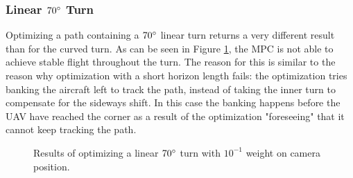 \subsubsection{Linear $70\degree$ Turn}

Optimizing a path containing a $70\degree$ linear turn returns a very different result than for the curved turn. As can be seen in Figure \ref{fig:turns_lin_70deg_pos1}, the MPC is not able to achieve stable flight throughout the turn. The reason for this is similar to the reason why optimization with a short horizon length fails: the optimization tries banking the aircraft left to track the path, instead of taking the inner turn to compensate for the sideways shift. In this case the banking happens before the UAV have reached the corner as a result of the optimization "foreseeing" that it cannot keep tracking the path.

\begin{figure}
	\caption{Results of optimizing a linear $70\degree$ turn with $10^{-1}$ weight on camera position.}
	\label{fig:turns_lin_70deg_pos1}
\end{figure}

